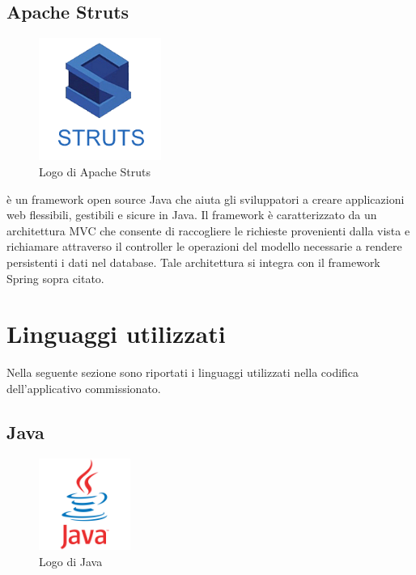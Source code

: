 \pagebreak

\subsection{Apache Struts}

\begin{figure}[!h]
	\centering
	\includegraphics[width=4cm]{../images/Struts-logo.png}
	\caption{Logo di Apache Struts}
\end{figure}

\ap{{[b]}} è un framework open source Java che aiuta gli sviluppatori a creare applicazioni web flessibili, gestibili e sicure in Java. Il framework è caratterizzato da un architettura MVC che consente di raccogliere le richieste provenienti dalla vista e richiamare attraverso il controller le operazioni del modello necessarie a rendere persistenti i dati nel database. Tale architettura si integra con il framework Spring sopra citato.

\pagebreak

\section{Linguaggi utilizzati}
Nella seguente sezione sono riportati i linguaggi utilizzati nella codifica dell'applicativo commissionato.

\subsection{Java}

\begin{figure}[!h]
	\centering
	\includegraphics[width=3cm]{../images/Java-logo.png}
	\caption{Logo di Java}
\end{figure}

